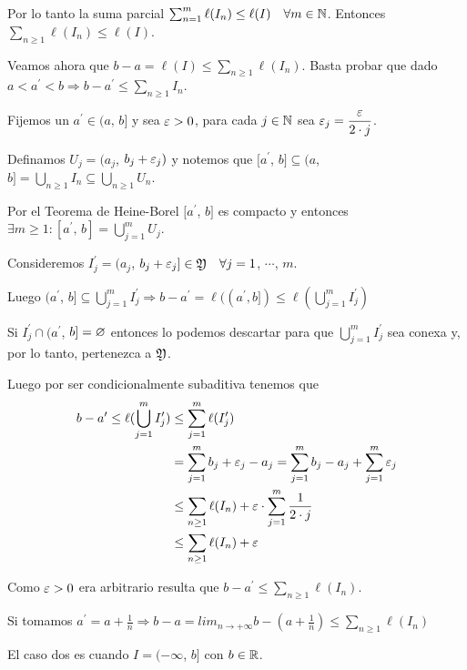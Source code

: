 Por lo tanto la suma parcial $\sum_{n = 1}^m \ell(I_n) \leq \ell(I) \quad \forall m \in \mathbb{N}$.
Entonces $\sum_{n \geq 1} \ell(I_n) \leq \ell(I)$.

Veamos ahora que $b-a = \ell(I) \leq \sum_{n \geq 1} \ell(I_n)$.
Basta probar que dado $a < a^{\prime} < b \Rightarrow b - a^{\prime} \leq \sum_{n \geq 1} I_n$.

Fijemos un $a^{\prime} \in (a\text{, } b]$ y sea $\varepsilon > 0$, para cada $j \in \mathbb{N}$ sea $\varepsilon_j = \dfrac{\varepsilon}{2 \cdot j}$.

Definamos $U_j = (a_j$, $b_j + \varepsilon_j)$ y notemos que $[a^\prime$, $b] \subseteq (a$, $b] = \bigcup_{n \geq 1} I_n \subseteq \bigcup_{n \geq 1} U_n$.

Por el Teorema de Heine-Borel $[a^\prime$, $b]$ es compacto y entonces $\exists m \geq 1 : [a^\prime \text{, } b] = \bigcup_{j = 1}^m U_j$.

Consideremos $I^\prime_j = (a_j$, $b_j + \varepsilon_j] \in \mathfrak{Y} \quad \forall j = 1$, $\cdots$, $m$.

Luego $(a^\prime$, $b] \subseteq \bigcup_{j = 1}^m I^\prime_j \Rightarrow b - a^\prime = \ell((a^\prime, b]) \leq \ell(\bigcup_{j = 1}^m I^\prime_j)$

Si $I^\prime_j \cap (a^\prime$, $b] = \varnothing$ entonces lo podemos descartar para que $\bigcup_{j = 1}^m I^\prime_j$ sea conexa y, por lo tanto, pertenezca a $\mathfrak{Y}$.

Luego por ser condicionalmente subaditiva tenemos que \begin{align*}
    b - a^\prime \leq \ell(\bigcup_{j = 1}^m I^\prime_j) & \leq \sum_{j = 1}^m \ell(I^\prime_j)                                               \\
                                                         & = \sum_{j = 1}^m b_j + \varepsilon_j - a_j = \sum_{j = 1}^m b_j - a_j + \sum_{j = 1}^m \varepsilon_j \\
                                                         & \leq \sum_{n \geq 1} \ell(I_n) + \varepsilon \cdot \sum_{j = 1}^m \dfrac{1}{2 \cdot j}      \\
                                                         & \leq \sum_{n \geq 1} \ell(I_n) + \varepsilon
\end{align*}

Como $\varepsilon > 0$ era arbitrario resulta que $b - a^\prime \leq \sum_{n \geq 1} \ell(I_n)$.

Si tomamos $a^\prime = a + \frac{1}{n} \Rightarrow b-a = lim_{n \to +\infty} b - (a + \frac{1}{n}) \leq \sum_{n \geq 1} \ell(I_n)$

El caso dos es cuando $I = (-\infty$, $b]$ con $b \in \mathbb{R}$.

